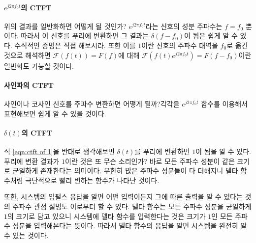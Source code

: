 \paragraph{$e^{j2\pi f_0t}$의 CTFT}
위의 결과를 일반화하면 어떻게 될 것인가? $e^{j2\pi f_0t}$라는 신호의 성분 주파수는 $f=f_0$ 뿐이다.
따라서 이 신호를 푸리에 변환하면 그 결과는 $\delta(f-f_0)$이 됨은 쉽게 알 수 있다. 수식적인 증명은 직접 해보시라.
또한 이를 $1$이란 신호의 주파수 대역을 $f_0$로 옮긴 것으로 해석하면 $\mathcal{F}(f(t))=F(f)$에 대해 $\mathcal{F}(f(t)e^{j2\pi f_0t})=F(f-f_0)$이란 일반화도 가능할 것이다.
\paragraph{사인파의 CTFT}
사인이나 코사인 신호를 주파수 변환하면 어떻게 될까?각각을 $e^{j2\pi f_0t}$ 함수를 이용해서 표현해보면 쉽게 알 수 있을 것이다.
\paragraph{$\delta(t)$의 CTFT}
식 \ref{eqn:ctft of 1}을 반대로 생각해보면 $\delta(t)$를 푸리에 변환하면 $1$이 됨을 알 수 있다.
푸리에 변환 결과가 $1$이란 것은 또 무슨 소리인가? 바로 모든 주파수 성분이 같은 크기로 균일하게 존재한다는 의미이다.
무한히 많은 주파수 성분들이 다 더해지니 델타 함수처럼 극단적으로 빨리 변하는 함수가 나타난 것이다.
\par
또한, 시스템의 임펄스 응답을 알면 어떤 입력이든지 그에 따른 출력을 알 수 있다는 것의 주파수 관점 설명도 이로부터 할 수 있다.
델타 함수는 모든 주파수 성분을 균일하게 $1$의 크기로 담고 있으니 시스템에 델타 함수를 입력한다는 것은 크기가 $1$인 모든 주파수 성분을 입력해본다는 뜻이다.
따라서 델타 함수의 응답을 알면 시스템을 완전히 알 수 있는 것이다.
